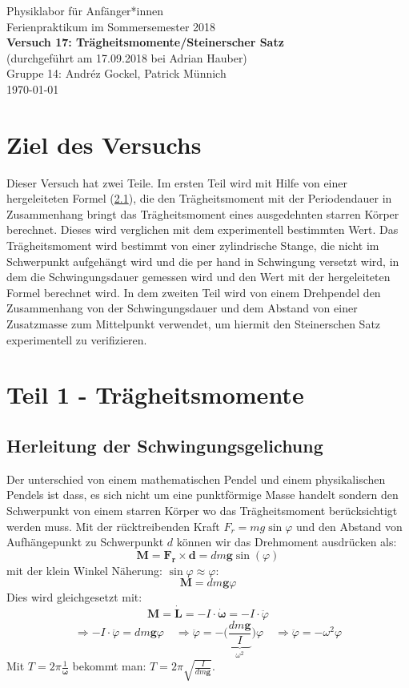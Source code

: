 \documentclass[11pt,a4paper]{article}
\renewcommand{\vec}{\boldsymbol}
\begin{document}
{
\centering 
\large 
Physiklabor für Anf\"anger*innen \\
Ferienpraktikum im Sommersemester 2018 \\[4mm]
\textbf{\LARGE 
Versuch 17: Trägheitsmomente/Steinerscher Satz
} \\[3mm]
(durchgef\"uhrt am 17.09.2018 bei Adrian Hauber)\\
Gruppe 14: Andréz Gockel, Patrick M\"unnich\\ 
\today \\[10mm]
}

\tableofcontents
\vspace{22pt}
\listoffigures
\vspace{22pt}
\listoftables
\pagebreak



\section{Ziel des Versuchs}

Dieser Versuch hat zwei Teile. Im ersten Teil wird mit Hilfe von einer hergeleiteten Formel (\ref{}), die den Trägheitsmoment mit der Periodendauer in Zusammenhang bringt das Trägheitsmoment eines ausgedehnten starren Körper berechnet. Dieses wird verglichen mit dem experimentell bestimmten Wert. Das Trägheitsmoment wird bestimmt von einer zylindrische Stange, die nicht im Schwerpunkt aufgehängt wird und die per hand in Schwingung versetzt wird, in dem die Schwingungsdauer gemessen wird und den Wert mit der hergeleiteten Formel berechnet wird. In dem zweiten Teil wird von einem Drehpendel den Zusammenhang von der Schwingungsdauer und dem Abstand von einer Zusatzmasse zum Mittelpunkt verwendet, um hiermit den Steinerschen Satz experimentell zu verifizieren. 

\section{Teil 1 - Trägheitsmomente}
\subsection{Herleitung der Schwingungsgelichung}

Der unterschied von einem mathematischen Pendel und einem physikalischen Pendels ist dass, es sich nicht um eine punktförmige Masse handelt sondern den Schwerpunkt von einem starren Körper wo das Trägheitsmoment berücksichtigt werden muss. Mit der rücktreibenden Kraft $F_r = mg\sin\varphi$ und den Abstand von Aufhängepunkt zu Schwerpunkt $d$ können wir das Drehmoment ausdrücken als:
$$\vec{M} = \vec{F_r} \times \vec{d} = dm\vec{g}\sin(\varphi)$$
mit der klein Winkel Näherung: $\sin\varphi \approx \varphi$:
$$\vec{M} = dm\vec{g}\varphi$$
Dies wird gleichgesetzt mit:
$$\vec{M} = \vec{\dot L} = - I \cdot \vec{\dot\omega} = - I \cdot \ddot \varphi$$
$$\Rightarrow - I \cdot \ddot \varphi = dm\vec{g}\varphi \quad \Rightarrow \ddot \varphi = - \bigg(\underbrace{\frac{dm\vec{g}}{I}}_{\omega^2}\bigg)\varphi \quad \Rightarrow \ddot \varphi = - \omega^2 \varphi$$
Mit $T = 2\pi \frac{1}{\vec{\omega}}$ bekommt man: $T = 2\pi \sqrt{\frac{I}{dm\vec{g}}}$.
\end{document}
